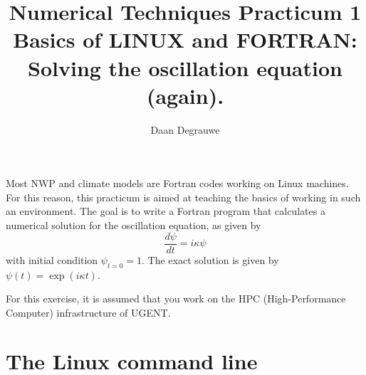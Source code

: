 \documentclass[a4paper]{article}
\title{%
	\bfseries%
	{\large Numerical Techniques Practicum 1}\\[3ex]
	{\Large Basics of LINUX and FORTRAN:}\\[1ex]
	{\Large Solving the oscillation equation (again).}
}
\author{Daan Degrauwe}
\begin{document}
%
\maketitle
%
\par
Most NWP and climate models are Fortran codes working on Linux machines. For this reason, this practicum is aimed at teaching the basics of working in such an environment. The goal is to write a Fortran program that calculates a numerical solution for the oscillation equation, as given by
%
\begin{equation*}
	\frac{d\psi}{dt}=i\kappa\psi
\end{equation*}
%
with initial condition $\psi_{t=0}=1$. The exact solution is given by $\psi(t)=\exp(i\kappa t)$.
%
\par
For this exercise, it is assumed that you work on the HPC (High-Performance Computer) infrastructure of UGENT.
%
\section{The Linux command line}
%
\end{document}
